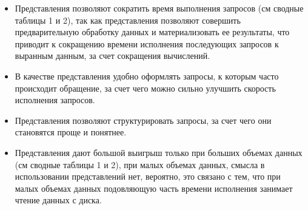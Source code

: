 \documentclass[a4paper,12pt]{article}
\begin{document}
\begin{itemize}
\item Представления позволяют сократить время выполнения запросов (см сводные таблицы 1 и 2), так как представления позволяют совершить предварительную обработку данных и материализовать ее результаты, что приводит к сокращению времени исполнения последующих запросов к выранным данным, за счет сокращения вычислений.

\item В качестве представления удобно оформлять запросы, к которым часто происходит обращение, за счет чего можно сильно улучшить скорость исполнения запросов.

\item Представления позволяют структурировать запросы, за счет чего они становятся проще и понятнее.

\item Представления дают большой выигрыш только при больших объемах данных (см сводные таблицы 1 и 2), при малых объемах данных, смысла в использовании представлений нет, вероятно, это связано с тем, что при малых объемах данных подовляющую часть времени исполнения занимает чтение данных с диска.
\end{itemize}
\end{document}
